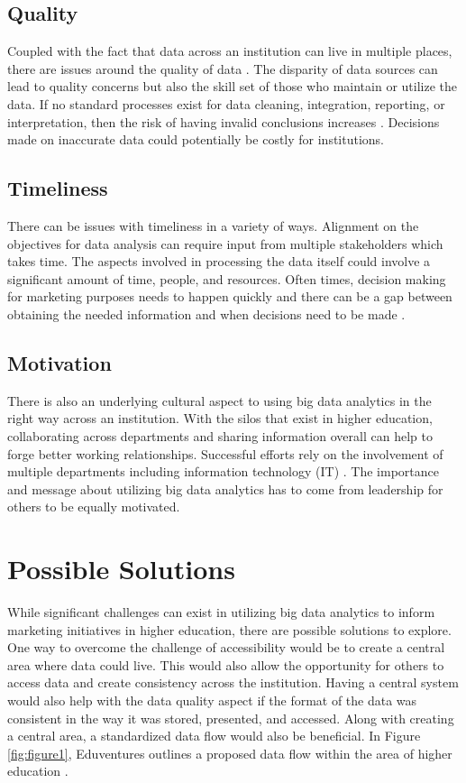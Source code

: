 \documentclass[sigconf]{acmart}
\begin{document}
\subsection{Quality}
Coupled with the fact that data across an institution can live in multiple places, there are issues around the quality of data \cite{Daniel2015}. The disparity of data sources can lead to quality concerns but also the skill set of those who maintain or utilize the data. If no standard processes exist for data cleaning, integration, reporting, or interpretation, then the risk of having invalid conclusions increases \cite{Marsh2006}. Decisions made on inaccurate data could potentially be costly for institutions. 

\subsection{Timeliness}
There can be issues with timeliness in a variety of ways. Alignment on the objectives for data analysis can require input from multiple stakeholders which takes time. The aspects involved in processing the data itself could involve a significant amount of time, people, and resources. Often times, decision making for marketing purposes needs to happen quickly and there can be a gap between obtaining the needed information and when decisions need to be made \cite{Marsh2006}. 

\subsection{Motivation}
There is also an underlying cultural aspect to using big data analytics in the right way across an institution. With the silos that exist in higher education, collaborating across departments and sharing information overall can help to forge better working relationships. Successful efforts rely on the involvement of multiple departments including information technology (IT) \cite{Daniel2015}. The importance and message about utilizing big data analytics has to come from leadership for others to be equally motivated. 

\section{Possible Solutions}

While significant challenges can exist in utilizing big data analytics to inform marketing initiatives in higher education, there are possible solutions to explore. One way to overcome the challenge of accessibility would be to create a central area where data could live. This would also allow the opportunity for others to access data and create consistency across the institution. Having a central system would also help with the data quality aspect if the format of the data was consistent in the way it was stored, presented, and accessed. Along with creating a central area, a standardized data flow would also be beneficial. In Figure \ref{fig:figure1}, Eduventures outlines a proposed data flow within the area of higher education \cite{Wiley2016}. 
\end{document}

